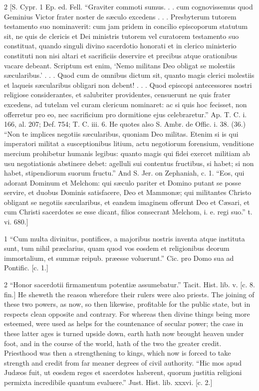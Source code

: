 2
[S. Cypr. 1 Ep. ed. Fell. “Graviter commoti sumus. . . cum cognovissemus quod Geminius Victor frater noster de sæculo excedens . . . Presbyterum tutorem testamento suo nominaverit: cum jam pridem in concilio episcoporum statutum sit, ne quis de clericis et Dei ministris tutorem vel curatorem testamento suo constituat, quando singuli divino sacerdotio honorati et in clerico ministerio constituti non nisi altari et sacrificiis deservire et precibus atque orationibus vacare debeant. Scriptum est enim, ‘Nemo militans Deo obligat se molestiis sæcularibus.’ . . . Quod cum de omnibus dictum sit, quanto magis clerici molestiis et laqueis sæcularibus obligari non debent! . . . Quod episcopi antecessores nostri religiose considerantes, et salubriter providentes, censuerunt ne quis frater excedens, ad tutelam vel curam clericum nominaret: ac si quis hoc fecisset, non offerretur pro eo, nec sacrificium pro dormitione ejus celebraretur.” Ap. T. C. i. 166, al. 207; Def. 754; T. C. iii. 6. He quotes also S. Ambr. de Offic. i. 38. (36.) “Non te implices negotiis sæcularibus, quoniam Deo militas. Etenim si is qui imperatori militat a susceptionibus litium, actu negotiorum forensium, venditione mercium prohibetur humanis legibus: quanto magis qui fidei exercet militiam ab usu negotiationis abstinere debet: agelluli sui contentus fructibus, si habet; si non habet, stipendiorum suorum fructu.” And S. Jer. on Zephaniah, c. 1. “Eos, qui adorant Dominum et Melchom: qui sæculo pariter et Domino putant se posse servire, et duobus Dominis satisfacere, Deo et Mammonæ; qui militantes Christo obligant se negotiis sæcularibus, et eandem imaginem offerunt Deo et Cæsari, et cum Christi sacerdotes se esse dicant, filios consecrant Melchom, i. e. regi suo.” t. vi. 680.]

1
“Cum multa divinitus, pontifices, a majoribus nostris inventa atque instituta sunt, tum nihil præclarius, quam quod vos eosdem et religionibus deorum immortalium, et summæ reipub. præesse voluerunt.” Cic. pro Domo sua ad Pontific. [c. 1.]

2
“Honor sacerdotii firmamentum potentiæ assumebatur.” Tacit. Hist. lib. v. [c. 8. fin.] He sheweth the reason wherefore their rulers were also priests. The joining of these two powers, as now, so then likewise, profitable for the public state, but in respects clean opposite and contrary. For whereas then divine things being more esteemed, were used as helps for the countenance of secular power; the case in these latter ages is turned upside down, earth hath now brought heaven under foot, and in the course of the world, hath of the two the greater credit. Priesthood was then a strengthening to kings, which now is forced to take strength and credit from far meaner degrees of civil authority. “Hic mos apud Judæos fuit, ut eosdem reges et sacerdotes haberent, quorum justitia religioni permixta incredibile quantum evaluere.” Just. Hist. lib. xxxvi. [c. 2.]

